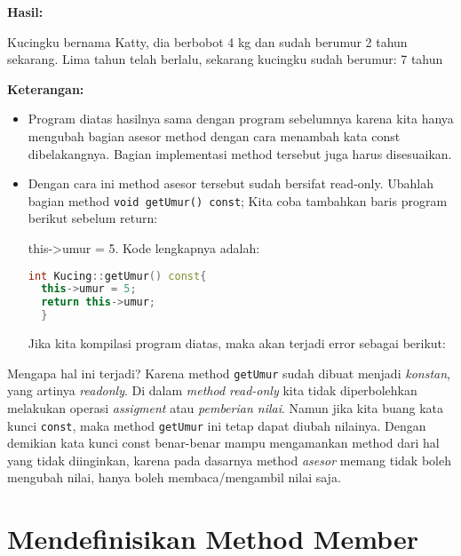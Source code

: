 \textbf{Hasil:}
\begin{lcverbatim}
Kucingku bernama Katty, 
dia berbobot 4 kg dan sudah
berumur 2 tahun sekarang. 
Lima tahun telah berlalu,
 sekarang kucingku sudah berumur: 7 tahun
\end{lcverbatim}


\textbf{Keterangan:}

\begin{itemize}
\item
  Program diatas hasilnya sama dengan program sebelumnya karena kita
  hanya mengubah bagian asesor method dengan cara menambah kata const
  dibelakangnya. Bagian implementasi method tersebut juga harus
  disesuaikan.
\item
  Dengan cara ini method asesor tersebut sudah bersifat read-only.
  Ubahlah bagian method \texttt{void\ getUmur()\ const}; Kita coba
  tambahkan baris program berikut sebelum return:

  this-\textgreater{}umur = 5.
  Kode lengkapnya adalah:
  
  \begin{lstlisting}[language=c++, numbers=none]
  int Kucing::getUmur() const{
  this->umur = 5;
  return this->umur;
  }
  \end{lstlisting}
  
  Jika kita kompilasi program diatas, maka akan terjadi error sebagai
  berikut:
  
  \begin{figure}[htbp]
  	\centering
{}

  \end{figure}
\end{itemize}



Mengapa hal ini terjadi? Karena method \texttt{getUmur} sudah dibuat
menjadi \emph{konstan}, yang artinya \emph{readonly}. Di dalam
\emph{method read-only} kita tidak diperbolehkan melakukan operasi
\emph{assigment} atau \emph{pemberian nilai}. Namun jika kita buang kata
kunci \texttt{const}, maka method \texttt{getUmur} ini tetap dapat
diubah nilainya. Dengan demikian kata kunci const benar-benar mampu
mengamankan method dari hal yang tidak diinginkan, karena pada dasarnya
method \emph{asesor} memang tidak boleh mengubah nilai, hanya boleh
membaca/mengambil nilai saja.

\section{Mendefinisikan Method
Member}\label{mendefinisikan-method-member}

